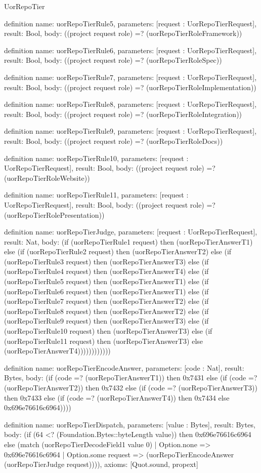 \begin{lexlean}{UorRepoTier}
\begin{semanticmodule}
definition{
  name: uorRepoTierRule5,
  parameters: [request : UorRepoTierRequest],
  result: Bool,
  body: ((project request role) =? (uorRepoTierRoleFramework))
}

definition{
  name: uorRepoTierRule6,
  parameters: [request : UorRepoTierRequest],
  result: Bool,
  body: ((project request role) =? (uorRepoTierRoleSpec))
}

definition{
  name: uorRepoTierRule7,
  parameters: [request : UorRepoTierRequest],
  result: Bool,
  body: ((project request role) =? (uorRepoTierRoleImplementation))
}

definition{
  name: uorRepoTierRule8,
  parameters: [request : UorRepoTierRequest],
  result: Bool,
  body: ((project request role) =? (uorRepoTierRoleIntegration))
}

definition{
  name: uorRepoTierRule9,
  parameters: [request : UorRepoTierRequest],
  result: Bool,
  body: ((project request role) =? (uorRepoTierRoleDocs))
}

definition{
  name: uorRepoTierRule10,
  parameters: [request : UorRepoTierRequest],
  result: Bool,
  body: ((project request role) =? (uorRepoTierRoleWebsite))
}

definition{
  name: uorRepoTierRule11,
  parameters: [request : UorRepoTierRequest],
  result: Bool,
  body: ((project request role) =? (uorRepoTierRolePresentation))
}

definition{
  name: uorRepoTierJudge,
  parameters: [request : UorRepoTierRequest],
  result: Nat,
  body: (if (uorRepoTierRule1 request) then (uorRepoTierAnswerT1) else (if (uorRepoTierRule2 request) then (uorRepoTierAnswerT2) else (if (uorRepoTierRule3 request) then (uorRepoTierAnswerT3) else (if (uorRepoTierRule4 request) then (uorRepoTierAnswerT4) else (if (uorRepoTierRule5 request) then (uorRepoTierAnswerT1) else (if (uorRepoTierRule6 request) then (uorRepoTierAnswerT1) else (if (uorRepoTierRule7 request) then (uorRepoTierAnswerT2) else (if (uorRepoTierRule8 request) then (uorRepoTierAnswerT2) else (if (uorRepoTierRule9 request) then (uorRepoTierAnswerT3) else (if (uorRepoTierRule10 request) then (uorRepoTierAnswerT3) else (if (uorRepoTierRule11 request) then (uorRepoTierAnswerT3) else (uorRepoTierAnswerT4))))))))))))
}

definition{
  name: uorRepoTierEncodeAnswer,
  parameters: [code : Nat],
  result: Bytes,
  body: (if (code =? (uorRepoTierAnswerT1)) then 0x7431 else (if (code =? (uorRepoTierAnswerT2)) then 0x7432 else (if (code =? (uorRepoTierAnswerT3)) then 0x7433 else (if (code =? (uorRepoTierAnswerT4)) then 0x7434 else 0x696e76616c6964))))
}

definition{
  name: uorRepoTierDispatch,
  parameters: [value : Bytes],
  result: Bytes,
  body: (if (64 <? (Foundation.Bytes::byteLength value)) then 0x696e76616c6964 else (match (uorRepoTierDecodeField1 value 0)
    | Option.none => 0x696e76616c6964
    | Option.some request => (uorRepoTierEncodeAnswer (uorRepoTierJudge request)))),
  axioms: [Quot.sound, propext]
}
\end{semanticmodule}
\end{lexlean}
